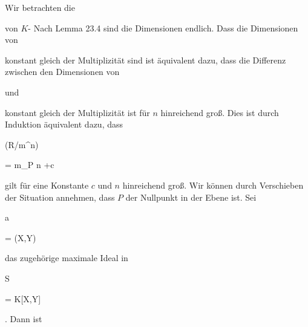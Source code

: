 {


Wir betrachten die


 {  }


von
$K$-
Nach
Lemma 23.4
sind die Dimensionen endlich. Dass die Dimensionen von

 konstant gleich der Multiplizität sind
 {} {}
ist äquivalent dazu, dass die Differenz zwischen den Dimensionen von

 und

 konstant gleich der Multiplizität ist für $n$ hinreichend groß. Dies ist durch Induktion äquivalent dazu, dass


\mavergleichskettedisp

{\vergleichskette

{ \dim (R/{\mathfrak m}^n)
}

{ =} { m_{P }  n  +c
}

{ } {
}

{ } {
}

{ } {
}

}
{}{}{}
gilt für eine Konstante $c$ und $n$ hinreichend groß. Wir können durch Verschieben der Situation annehmen, dass $P$ der Nullpunkt in der Ebene ist. Sei


\mavergleichskette

{\vergleichskette

{ {\mathfrak a}
}

{ = }{ (X,Y)
}

{  }{
}

{    }{
}

{   }{
}

}
{}{}{}
das zugehörige maximale Ideal in


\mavergleichskette

{\vergleichskette

{S
}

{ = }{ K[X,Y]
}

{  }{
}

{    }{
}

{   }{
}

}
{}{}{.}
Dann ist


}
